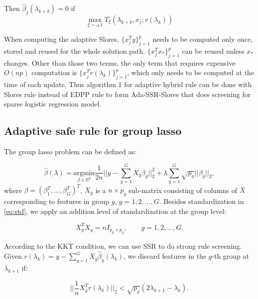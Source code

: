 \begin{theorem}
Then $\hat{\beta}_j(\lambda_{k+b})=0$ if
        \begin{equation}
            \max_{\xi=\pm1} T_\xi(\lambda_{k+b},x_j;r(\lambda_k))
        \end{equation}
\end{theorem}

When computing the adaptive Slores, $\{x_j^Ty\}_{j=1}^p$ needs to be computed only once, stored and reused for the whole solution path. $\{x_j^Tx_*\}_{j=1}^p$ can be reused unless $x_*$ changes. Other than those two terms, the only term that requires expensive $O(np)$ computation is $\{x_j^Tr(\lambda_k)\}_{j=1}^p$, which only needs to be computed at the time of each update. Thus algorithm 1 for adaptive hybrid rule can be done with Slores rule instead of EDPP rule to form Ada-SSR-Slores that does screening for sparse logistic regression model.

\subsection{Adaptive safe rule for group lasso}

The group lasso problem \citep{yuan2006model} can be defined as:

\begin{equation}
    \label{eq:glasso}
    \hat{\beta}(\lambda) = \underset{\beta\in \mathbb{R}^p}{\mathrm{argmin}}\frac{1}{2n}\bigg|\bigg|y-\sum_{g=1}^GX_g\beta_g\bigg|\bigg|_2^2+\lambda\sum_{g=1}^G\sqrt{p_g}||\beta_g||_2,
\end{equation}
where $\beta=(\beta_1^T,...,\beta_G^T)^T$, $X_g$ is a $n\times p_g$ sub-matrix consisting of columns of $X$ corresponding to features in group $g$, $g=1,2,...,G$. Besides standardization in \eqref{eq:std}, we apply an addition level of standardization at the group level\citep{breheny2015group}:

\begin{equation}
    \label{eq:stdg}
    X_g^TX_g=nI_{p_g\times p_g},\qquad g=1,2,...,G.
\end{equation}

According to the KKT condition, we can use SSR to do strong rule screening. Given $r(\lambda_k)=y-\sum_{g=1}^GX_g\hat{\beta}_g(\lambda_k)$, we discard features in the $g$-th group at $\lambda_{k+1}$ if:

\begin{equation}
    \bigg|\bigg|\frac{1}{n}X_g^Tr(\lambda_k)\bigg|\bigg|_2<\sqrt{p_g}(2\lambda_{k+1}-\lambda_k).
\end{equation}

